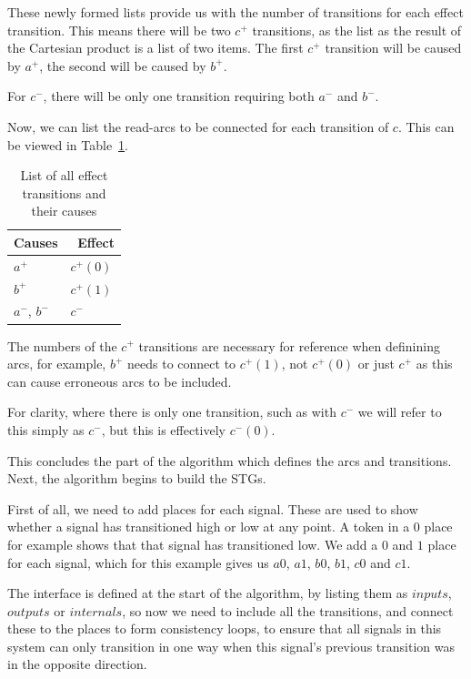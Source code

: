 \documentclass[british,conference,compsoc]{IEEEtran}
\begin{document}
These newly formed lists provide us with the number of transitions for each 
effect transition. This means there will be two $c^{+}$ transitions, as the list
as the result of the Cartesian product is a list of two items. The first 
$c^{+}$ transition will be caused by $a^{+}$, the second will be caused by 
$b^{+}$. 

For $c^{-}$, there will be only one transition requiring both $a^{-}$ and 
$b^{-}$.

Now, we can list the read-arcs to be connected for each transition of $c$.
This can be viewed in Table~\ref{tab:list-by-transition}.

\begin{table}[h]
\caption{List of all effect transitions and their causes
		\label{tab:list-by-transition}}

  \centering
\begin{tabular}[htb]{| m{2.6cm} | m{2.0cm} |}
  \hline
Causes & \, Effect \\ \hline \hline
$a^{+}$ & $c^{+}(0)$ \\ \hline
$b^{+}$ & $c^{+}(1)$ \\ \hline
$a^{-}$, $b^{-}$ & $c^{-}$ \\ \hline
  \end{tabular}
\vspace{-1mm}
\end{table}

The numbers of the $c^{+}$ transitions are necessary for reference
when definining arcs, for example, $b^{+}$ needs to connect to 
$c^{+}(1)$, not $c^{+}(0)$ or just $c^{+}$ as this can cause 
erroneous arcs to be included. 

For clarity, where there is only one transition, such as with $c^{-}$
we will refer to this simply as $c^{-}$, but this is effectively $c^{-}(0)$.

This concludes the part of the algorithm which defines the arcs
and transitions. Next, the algorithm begins to build the STGs. 

First of all, we need to add places for each signal. These are used to
show whether a signal has transitioned high or low at any point. 
A token in a $0$ place for example shows that that signal has 
transitioned low. We add a $0$ and $1$ place for each signal, 
which for this example gives us $a0$, $a1$, $b0$, $b1$, $c0$ and $c1$.

The interface is defined at the start of the algorithm, by listing them as 
$inputs$, $outputs$ or $internals$, so now we need to include all the 
transitions, and connect these to the places to form consistency loops, to 
ensure that all signals in this system can only transition in one way when this 
signal's previous transition was in the opposite direction. 
\end{document}
